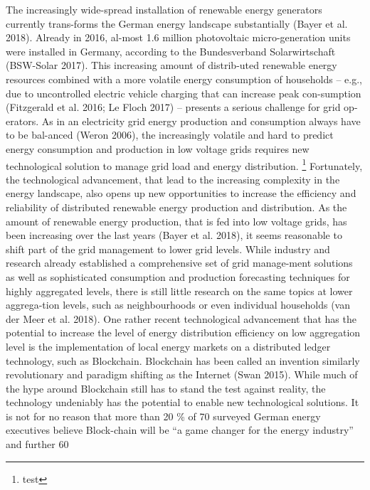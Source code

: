 The increasingly wide-spread installation of renewable energy generators currently trans-forms the German energy landscape substantially (Bayer et al. 2018). Already in 2016, al-most 1.6 million photovoltaic micro-generation units were installed in Germany, according to the Bundesverband Solarwirtschaft (BSW-Solar 2017). This increasing amount of distrib-uted renewable energy resources combined with a more volatile energy consumption of households – e.g., due to uncontrolled electric vehicle charging that can increase peak con-sumption (Fitzgerald et al. 2016; Le Floch 2017) – presents a serious challenge for grid op-erators. As in an electricity grid energy production and consumption always have to be bal-anced (Weron 2006), the increasingly volatile and hard to predict energy consumption and production in low voltage grids requires new technological solution to manage grid load and energy distribution. \footnote{test}
Fortunately, the technological advancement, that lead to the increasing complexity in the energy landscape, also opens up new opportunities to increase the efficiency and reliability of distributed renewable energy production and distribution. As the amount of renewable energy production, that is fed into low voltage grids, has been increasing over the last years (Bayer et al. 2018), it seems reasonable to shift part of the grid management to lower grid levels. While industry and research already established a comprehensive set of grid manage-ment solutions as well as sophisticated consumption and production forecasting techniques for highly aggregated levels, there is still little research on the same topics at lower aggrega-tion levels, such as neighbourhoods or even individual households (van der Meer et al. 2018).
One rather recent technological advancement that has the potential to increase the level of energy distribution efficiency on low aggregation level is the implementation of local energy markets on a distributed ledger technology, such as Blockchain. Blockchain has been called an invention similarly revolutionary and paradigm shifting as the Internet (Swan 2015). While much of the hype around Blockchain still has to stand the test against reality, the technology undeniably has the potential to enable new technological solutions. It is not for no reason that more than 20 \% of 70 surveyed German energy executives believe Block-chain will be “a game changer for the energy industry” and further 60 %
